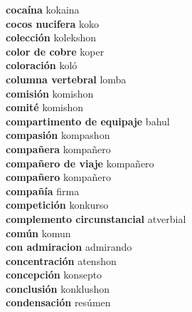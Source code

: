 \textbf{ cocaína  } kokaina \\
\textbf{ cocos nucifera  } koko \\
\textbf{ colección  } kolekshon \\
\textbf{ color de cobre  } koper \\
\textbf{ coloración  } koló \\
\textbf{ columna vertebral  } lomba \\
\textbf{ comisión  } komishon \\
\textbf{ comité  } komishon \\
\textbf{ compartimento de equipaje  } bahul \\
\textbf{ compasión  } kompashon \\
\textbf{ compañera  } kompañero \\
\textbf{ compañero de viaje  } kompañero \\
\textbf{ compañero  } kompañero \\
\textbf{ compañía  } firma \\
\textbf{ competición  } konkurso \\
\textbf{ complemento circunstancial  } atverbial \\
\textbf{ común  } komun \\
\textbf{ con admiracion  } admirando \\
\textbf{ concentración  } atenshon \\
\textbf{ concepción  } konsepto \\
\textbf{ conclusión  } konklushon \\
\textbf{ condensación  } resúmen \\

